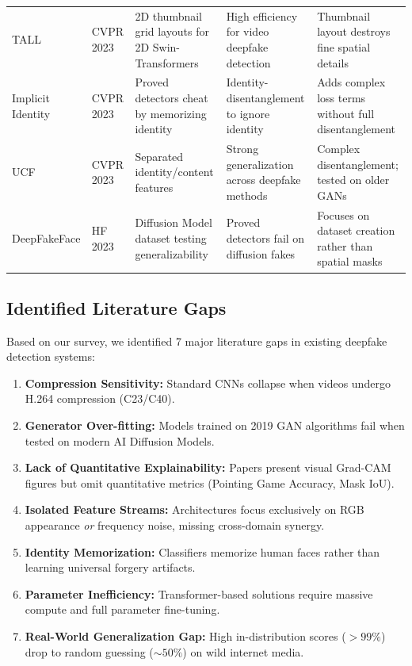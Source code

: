 \documentclass[10pt,conference]{IEEEtran}
\begin{document}
\begin{table}[t]
{\begin{tabular}{lllll}
TALL \cite{xu2023tall} & CVPR 2023 & 2D thumbnail grid layouts for 2D Swin-Transformers & High efficiency for video deepfake detection & Thumbnail layout destroys fine spatial details \\
Implicit Identity \cite{dong2023implicit} & CVPR 2023 & Proved detectors cheat by memorizing identity & Identity-disentanglement to ignore identity & Adds complex loss terms without full disentanglement \\
UCF \cite{yan2023ucf} & CVPR 2023 & Separated identity/content features & Strong generalization across deepfake methods & Complex disentanglement; tested on older GANs \\
DeepFakeFace \cite{song2023robustness} & HF 2023 & Diffusion Model dataset testing generalizability & Proved detectors fail on diffusion fakes & Focuses on dataset creation rather than spatial masks \\
\bottomrule
\end{tabular}
}
\end{table}

\subsection{Identified Literature Gaps}
Based on our survey, we identified 7 major literature gaps in existing deepfake detection systems:
\begin{enumerate}
    \item \textbf{Compression Sensitivity:} Standard CNNs collapse when videos undergo H.264 compression (C23/C40).
    \item \textbf{Generator Over-fitting:} Models trained on 2019 GAN algorithms fail when tested on modern AI Diffusion Models.
    \item \textbf{Lack of Quantitative Explainability:} Papers present visual Grad-CAM figures but omit quantitative metrics (Pointing Game Accuracy, Mask IoU).
    \item \textbf{Isolated Feature Streams:} Architectures focus exclusively on RGB appearance \emph{or} frequency noise, missing cross-domain synergy.
    \item \textbf{Identity Memorization:} Classifiers memorize human faces rather than learning universal forgery artifacts.
    \item \textbf{Parameter Inefficiency:} Transformer-based solutions require massive compute and full parameter fine-tuning.
    \item \textbf{Real-World Generalization Gap:} High in-distribution scores ($>99\%$) drop to random guessing ($\sim 50\%$) on wild internet media.
\end{enumerate}
\end{document}
